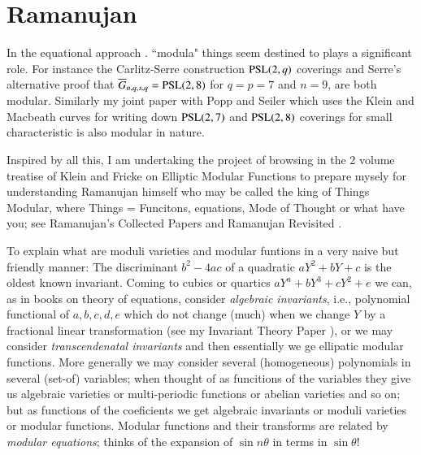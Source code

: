 \section{Ramanujan}\label{chap1-sec9}

In the equational approach . ``modula" things seem destined to plays a significant role. For instance the Carlitz-Serre construction $\operatorname{PSL}(2,q)$ coverings and Serre's alternative proof \cite{chap1-key57} that $\overline{G}_{n,q,s,q} = \operatorname{PSL}(2,8)$ for $q=p=7$ and $n=9$, are both modular. Similarly my joint paper \cite{chap1-key16} with Popp and Seiler which uses the Klein and Macbeath curves for writing down $\operatorname{PSL} (2,7)$ and $\operatorname{PSL} (2,8)$  coverings for small characteristic is also modular in nature. 

Inspired by all this, I am undertaking the project of browsing in the 2 volume treatise of Klein and Fricke \cite{chap1-key43} on Elliptic Modular Functions to prepare mysely for understanding Ramanujan himself who may be called the king of Things Modular, where Things = Funcitons, equations, Mode of Thought or what have you; see Ramanujan's Collected Papers \cite{chap1-key50} and Ramanujan Revisited \cite{chap1-key15}. 

To explain what are moduli varieties and modular funtions in a very naive but friendly manner: The discriminant $b^{2}-4ac$ of a quadratic $aY^{2}+bY+c$ is the oldest known invariant. Coming to cubics or quartics $aY^{a} + bY^{3} +cY^{2} +e$ we can, as in books on theory of equations, consider \textit{algebraic invariants}, i.e., polynomial functional of $a,b,c,d,e$ which do not change (much) when we change $Y$ by a fractional linear transformation (see my Invariant Theory Paper \cite{chap1-key13}), or we may consider \textit{transcendenatal invariants} and then essentially we ge ellipatic modular functions. More generally we may consider several (homogeneous) polynomials in several (set-of) variables; when thought of as funcitions of the variables they give us algebraic varieties or multi-periodic functions or abelian varieties and so on; but as functions of the coeficients we get algebraic invariants or moduli varieties or modular functions. Modular functions and their transforms are related by \textit{modular equations}; thinks of the expansion of $\sin n\theta$ in terms in $\sin \theta$!


